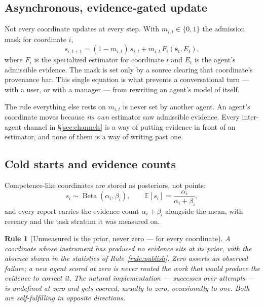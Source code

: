 \documentclass[11pt]{article}
\newtheorem{drule}{Rule}
\newcommand{\op}[1]{\operatorname{#1}}
\begin{document}
\subsection{Asynchronous, evidence-gated update}

Not every coordinate updates at every step. With $m_{i,t}\in\{0,1\}$ the admission mask for coordinate $i$,
\begin{equation}
s_{i,t+1}=(1-m_{i,t})\,s_{i,t}+m_{i,t}\,F_i(\mathbf{s}_t,E_t),
\label{eq:async}
\end{equation}
where $F_i$ is the specialized estimator for coordinate $i$ and $E_t$ is the agent's admissible evidence. The mask is set only by a source clearing that coordinate's provenance bar. This single equation is what prevents a conversational turn --- with a user, or with a manager --- from rewriting an agent's model of itself.

\begin{claimbox}{The rule everything else rests on}
$m_{i,t}$ is never set by another agent. An agent's coordinate moves because \emph{its own} estimator saw admissible evidence. Every inter-agent channel in \S\ref{sec:channels} is a way of putting evidence in front of an estimator, and none of them is a way of writing past one.
\end{claimbox}

\subsection{Cold starts and evidence counts}

Competence-like coordinates are stored as posteriors, not points:
\begin{equation}
s_i\sim\op{Beta}(\alpha_i,\beta_i),\qquad \mathbb{E}[s_i]=\frac{\alpha_i}{\alpha_i+\beta_i},
\label{eq:beta}
\end{equation}
and every report carries the evidence count $\alpha_i+\beta_i$ alongside the mean, with recency and the task stratum it was measured on.

\begin{drule}[Unmeasured is the prior, never zero --- for every coordinate]
\label{rule:prior}
A coordinate whose instrument has produced no evidence sits at its prior, with the absence shown in the statistics of Rule~\ref{rule:publish}. Zero asserts an observed failure; a new agent scored at zero is never routed the work that would produce the evidence to correct it. The natural implementation --- successes over attempts --- is undefined at zero and gets coerced, usually to zero, occasionally to one. Both are self-fulfilling in opposite directions.
\end{drule}
\end{document}
